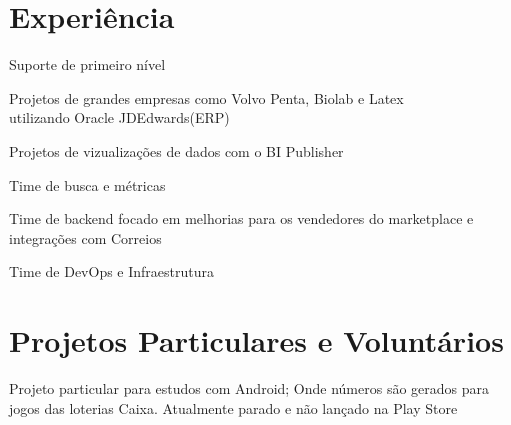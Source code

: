 \documentclass[]{deedy-resume-openfont}
\begin{document}
\begin{minipage}[t]{0.66\textwidth} 


\section{Experiência}

\vspace{\topsep} %
\begin{tightemize}
\item Suporte de primeiro nível
\end{tightemize}
\sectionsep

\begin{tightemize}
\item Projetos de grandes empresas como Volvo Penta, Biolab e Latex \\
utilizando Oracle JDEdwards(ERP)
\item Projetos de vizualizações de dados com o BI Publisher
\end{tightemize}
\sectionsep

\begin{tightemize}
\item Time de busca e métricas
\item Time de backend focado em melhorias para os vendedores do marketplace e integrações com Correios
\item Time de DevOps e Infraestrutura
\end{tightemize}
\sectionsep


\section{Projetos Particulares e Voluntários}
Projeto particular para estudos com Android; Onde números são gerados para jogos das loterias Caixa. Atualmente parado e não lançado na Play Store \sectionsep


\end{minipage}
\end{document}
